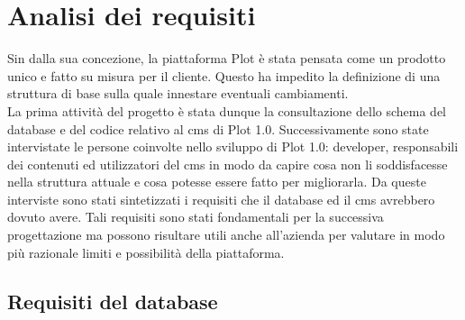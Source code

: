 
\chapter{Analisi dei requisiti}
\label{cap:analisi-requisiti}

Sin dalla sua concezione, la piattaforma Plot è stata pensata come un prodotto unico e fatto su misura per il cliente. Questo ha impedito la definizione di una struttura di base sulla quale innestare eventuali cambiamenti. \\
La prima attività del progetto è stata dunque la consultazione dello schema del database e del codice relativo al \gls{cms}\glsfirstoccur{} di Plot 1.0. Successivamente sono state intervistate le persone coinvolte nello sviluppo di Plot 1.0: developer, responsabili dei contenuti ed utilizzatori del \gls{cms}\glsfirstoccur{} in modo da capire cosa non li soddisfacesse nella struttura attuale e cosa potesse essere fatto per migliorarla.
Da queste interviste sono stati sintetizzati i requisiti che il database ed il \gls{cms}\glsfirstoccur{} avrebbero dovuto avere. Tali requisiti sono stati fondamentali per la successiva progettazione ma possono risultare utili anche all'azienda per valutare in modo più razionale limiti e possibilità della piattaforma.

\section{Requisiti del database}
